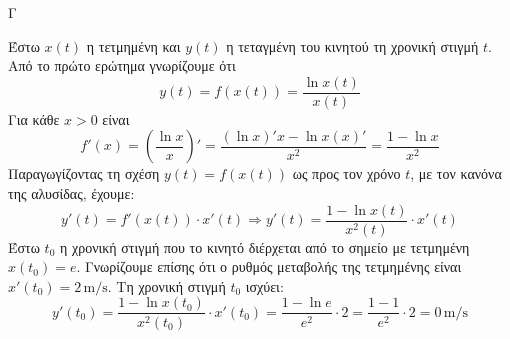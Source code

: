 \begin{thema}{Γ}
\begin{erwthma}
\item Έστω $x(t)$ η τετμημένη και $y(t)$ η τεταγμένη του κινητού τη χρονική στιγμή $t$. Από το πρώτο ερώτημα γνωρίζουμε ότι
\[y(t)=f(x(t))=\frac{\ln x(t)}{x(t)}\]
Για κάθε $x>0$ είναι
\[f'(x)=\left(\frac{\ln x}{x}\right)'=\frac{(\ln x)'x-\ln x (x)'}{x^2}=\frac{1-\ln x}{x^2}\]
Παραγωγίζοντας τη σχέση $y(t)=f(x(t))$ ως προς τον χρόνο $t$, με τον κανόνα της αλυσίδας, έχουμε:
\[y'(t)=f'(x(t))\cdot x'(t) \Rightarrow y'(t)=\frac{1-\ln x(t)}{x^2(t)}\cdot x'(t)\]
Έστω $t_0$ η χρονική στιγμή που το κινητό διέρχεται από το σημείο με τετμημένη $x(t_0)=e$. Γνωρίζουμε επίσης ότι ο ρυθμός μεταβολής της τετμημένης είναι $x'(t_0)=2\,\text{m/s}$. Τη χρονική στιγμή $t_0$ ισχύει:
\[y'(t_0)=\frac{1-\ln x(t_0)}{x^2(t_0)}\cdot x'(t_0)=\frac{1-\ln e}{e^2}\cdot 2=\frac{1-1}{e^2}\cdot 2=0\,\text{m/s}\]
\end{erwthma}
\end{thema}
